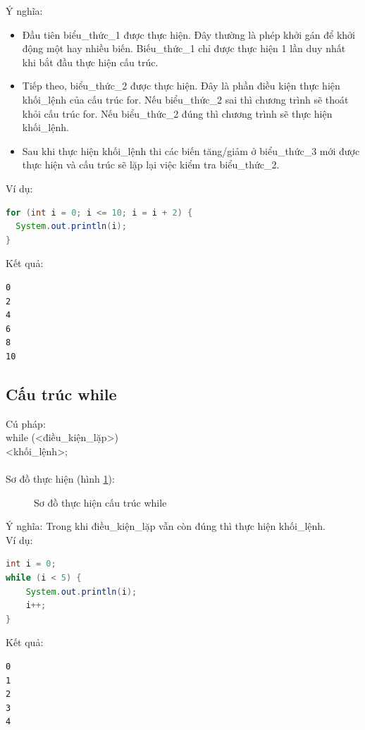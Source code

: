 \indent Ý nghĩa: 
\begin{itemize}
\item Đầu tiên {\ttfamily biểu\_thức\_1} được thực hiện. Đây thường là phép khởi gán để khởi động một hay nhiều biến. {\ttfamily Biếu\_thức\_1} chỉ được thực hiện 1 lần duy nhất khi bắt đầu thực hiện cấu trúc.
\item Tiếp theo, {\ttfamily biểu\_thức\_2} được thực hiện. Đây là phần điều kiện thực hiện {\ttfamily khối\_lệnh} của cấu trúc for. Nếu {\ttfamily biểu\_thức\_2} sai thì chương trình sẽ thoát khỏi cấu trúc for. Nếu {\ttfamily biểu\_thức\_2} đúng thì chương trình sẽ thực hiện {\ttfamily khối\_lệnh}.
\item Sau khi thực hiện {\ttfamily khối\_lệnh} thi các biến tăng/giảm ở {\ttfamily biểu\_thức\_3} mới được thực hiện và cấu trúc sẽ lặp lại việc kiểm tra {\ttfamily biểu\_thức\_2}.
\end{itemize}
\indent Ví dụ:\\
\begin{lstlisting}[escapechar=',language=java]	
for (int i = 0; i <= 10; i = i + 2) {
  System.out.println(i);
}
\end{lstlisting}

\indent Kết quả:
\begin{verbatim}
0
2
4
6
8
10
\end{verbatim}
\subsection{Cấu trúc while}
\indent Cú pháp:\\
{\ttfamily
while (<điều\_kiện\_lặp>) {\\
\indent <khối\_lệnh>;\\
}}\\
\indent Sơ đồ thực hiện (hình \ref{hinh15}):
\begin{figure}[!ht]
\centering

\caption{Sơ đồ thực hiện cấu trúc while}\label{hinh15} 
\end{figure}

\indent Ý nghĩa: Trong khi {\ttfamily điều\_kiện\_lặp} vẫn còn đúng thì thực hiện {\ttfamily khối\_lệnh}.\\
\indent Ví dụ:
\begin{lstlisting}[escapechar=',language=java]	
int i = 0;
while (i < 5) {
	System.out.println(i);
	i++;
}\end{lstlisting}

\indent Kết quả:
\begin{verbatim}
0
1
2
3
4
\end{verbatim}
